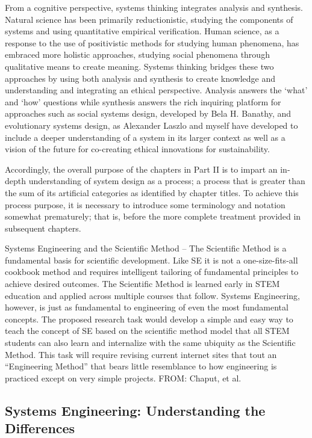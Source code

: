 From a cognitive perspective, systems thinking integrates analysis and synthesis. Natural science has been primarily reductionistic, studying the components of systems and using quantitative empirical verification. Human science, as a response to the use of positivistic methods for studying human phenomena, has embraced more holistic approaches, studying social phenomena through qualitative means to create meaning. Systems thinking bridges these two approaches by using both analysis and synthesis to create knowledge and understanding and integrating an ethical perspective. Analysis answers the `what’ and `how’ questions while synthesis answers the rich inquiring platform for approaches such as social systems design, developed by Bela H. Banathy, and evolutionary systems design, as Alexander Laszlo and myself have developed to include a deeper understanding of a system in its larger context as well as a vision of the future for co-creating ethical innovations for sustainability.

Accordingly, the overall purpose of the chapters in Part II is to impart an in-depth understanding of system design as a process; a process that is greater than the sum of its artificial categories as identified by chapter titles. To achieve this process purpose, it is necessary to introduce some terminology and notation somewhat prematurely; that is, before the more complete treatment provided in subsequent chapters.

Systems Engineering and the Scientific Method – The Scientific Method is a fundamental basis for scientific development. Like SE it is not a one-size-fits-all cookbook method and requires intelligent tailoring of fundamental principles to achieve desired outcomes. The Scientific Method is learned early in STEM education and applied across multiple courses that follow. Systems Engineering, however, is just as fundamental to engineering of even the most fundamental concepts. The proposed research task would develop a simple and easy way to teach the concept of SE based on the scientific method model that all STEM students can also learn and internalize with the same ubiquity as the Scientific Method. This task will require revising current internet sites that tout an ``Engineering Method'' that bears little resemblance to how engineering is practiced except on very simple projects. FROM: Chaput, et al.

\subsection{Systems Engineering: Understanding the Differences}

